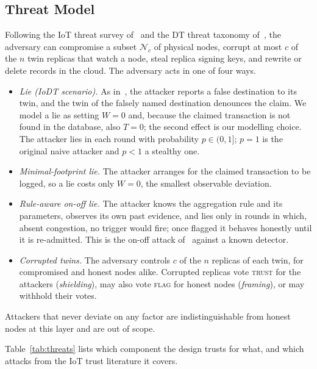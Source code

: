 \documentclass[lineno,pdflatex,sn-nature]{sn-jnl}
\theoremstyle{thmstyleone}%
\theoremstyle{thmstylethree}%
\begin{document}
\subsection{Threat Model}
\label{subsec:threat}
Following the IoT threat survey of~\cite{neshenko2019demystifying} and
the DT threat taxonomy of~\cite{alcaraz2022digital}, the adversary can
compromise a subset $\mathcal{N}_c$ of physical nodes, corrupt at most
$c$ of the $n$ twin replicas that watch a node, steal replica signing
keys, and rewrite or delete records in the cloud.  The adversary acts
in one of four ways.
\begin{itemize}
\item \emph{Lie (IoDT scenario).}  As in~\cite{soula2024iodt}, the
attacker reports a false destination to its twin, and the twin of the
falsely named destination denounces the claim.  We model a lie as
setting $W=0$ and, because the claimed transaction is not found in the
database, also $T=0$; the second effect is our modelling choice.  The
attacker lies in each round with probability $p\in(0,1]$; $p=1$ is the
original naive attacker and $p<1$ a stealthy one.
\item \emph{Minimal-footprint lie.}  The attacker arranges for the
claimed transaction to be logged, so a lie costs only $W=0$, the
smallest observable deviation.
\item \emph{Rule-aware on-off lie.}  The attacker knows the
aggregation rule and its parameters, observes its own past evidence,
and lies only in rounds in which, absent congestion, no trigger would
fire; once flagged it behaves honestly until it is re-admitted.  This
is the on-off attack of~\cite{sun2006trust} against a known detector.
\item \emph{Corrupted twins.}  The adversary controls $c$ of the $n$ replicas
of each twin, for compromised and honest nodes alike.  Corrupted replicas
vote \textsc{trust} for the attackers (\emph{shielding}), may also
vote \textsc{flag} for honest nodes (\emph{framing}), or may withhold
their votes.
\end{itemize}
Attackers that never deviate on any factor are indistinguishable from
honest nodes at this layer and are out of scope.

Table~\ref{tab:threats} lists which component the design trusts for
what, and which attacks from the IoT trust literature it covers.
\end{document}
